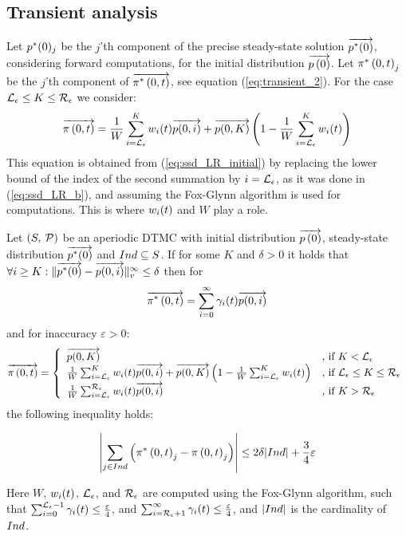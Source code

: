 \documentclass{entcs}
\newcommand{\SubSection}[1]{\subsection{#1}}
\begin{document}
	\SubSection{Transient analysis \label{ss:transient_ssd}}

		Let $p^{*}(0)_{j}$ be the $j$'th component of the precise steady-state solution $\overrightarrow{p^{*}(0)}$, considering forward computations, for the initial distribution $\overrightarrow{p \left( 0 \right)}$.  
		Let $\pi^{*} \left(0, t \right )_{j}$ be the $j$'th component of $\overrightarrow{\pi^{*} \left(0, t \right )}$, see equation (\ref{eq:transient_2}). For the case $\mathcal{L}_{\epsilon} \leq K \leq \mathcal{R}_{\epsilon}$ we consider:
		{\small
		\[
			\overrightarrow{\pi \left(0, t \right )} = \frac{1}{W} \sum_{i=\mathcal{L}_{\epsilon}}^{K}w_{i}(t) \overrightarrow{p(0,i)} + \overrightarrow{p(0,K)} \left(1- \frac{1}{W} \sum_{i=\mathcal{L}_{\epsilon}}^{K}w_{i}(t) \right)
		\]
		}
		This equation is obtained from (\ref{eq:ssd_LR_initial}) by replacing the lower bound of the index of the second summation by $i=\mathcal{L}_{\epsilon}$, as it was done in (\ref{eq:ssd_LR_b}), and assuming the Fox-Glynn algorithm is used for computations. This is where $w_{i}(t)$ and $W$ play a role.
			
		\begin{theorem}
			\label{th:error_fwd}
			Let $\left( S,\: \mathcal{P} \right)$ be an aperiodic DTMC with initial distribution $\overrightarrow{p \left( 0 \right)}$, steady-state distribution $\overrightarrow{p^{*}(0)}$ and $Ind \subseteq S$. If for some $K$ and $\delta > 0$ it holds that $\forall i \geq K : \lVert  \overrightarrow{p^{*}(0)} - \overrightarrow{p(0,i)}  \rVert_{v}^{\infty} \leq \delta$ then for 
			{\small
			\[
				\overrightarrow{\pi^{*} \left(0, t \right )} = \sum_{i=0}^{\infty}\gamma_{i}(t) \overrightarrow{p(0,i)}
			\]
			}
			and for inaccuracy $\varepsilon > 0$:
			{\small
			\begin{equation}
				\displaystyle
				\overrightarrow{\pi \left(0, t \right )} = \left\{
				\begin{array}{ll}
					\overrightarrow{p(0,K)} & \text{, if } K < \mathcal{L}_{\epsilon}\\
					\frac{1}{W} \sum_{i=\mathcal{L}_{\epsilon}}^{K}w_{i}(t) \overrightarrow{p(0,i)} + \overrightarrow{p(0,K)} \left(1- \frac{1}{W} \sum_{i=\mathcal{L}_{\epsilon}}^{K}w_{i}(t) \right) & \text{, if } \mathcal{L}_{\epsilon} \leq K \leq \mathcal{R}_{\epsilon}\\
					\frac{1}{W} \sum_{i=\mathcal{L}_{\epsilon}}^{\mathcal{R}_{\epsilon}}w_{i}(t) \overrightarrow{p(0,i)} & \text{, if } K > \mathcal{R}_{\epsilon}\\
				\end{array}
				\right .
				\nonumber
			\end{equation}
			}
			the following inequality holds:
			{\small
			\begin{fframe}{0.75}{-0.0}
				\[
					\left| \sum_{j \in Ind} \left( \pi^{*} \left(0, t \right )_{j} - \pi \left(0, t \right )_{j} \right) \right| \leq 2 \delta |Ind| + \frac{3}{4} \varepsilon
				\]
			\end{fframe}
			}
			Here $W$, $w_{i}(t)$, $\mathcal{L}_{\epsilon}$, and $\mathcal{R}_{\epsilon}$ are computed using the Fox-Glynn algorithm, such that $\sum_{i=0}^{\mathcal{L}_{\epsilon}-1} \gamma_{i}(t) \leq \frac{\varepsilon}{4}$, and $\sum_{i=\mathcal{R}_{\epsilon}+1}^{\infty} \gamma_{i}(t) \leq \frac{\varepsilon}{4}$, and $| Ind |$ is the cardinality of $Ind$.
		\end{theorem}
\end{document}
